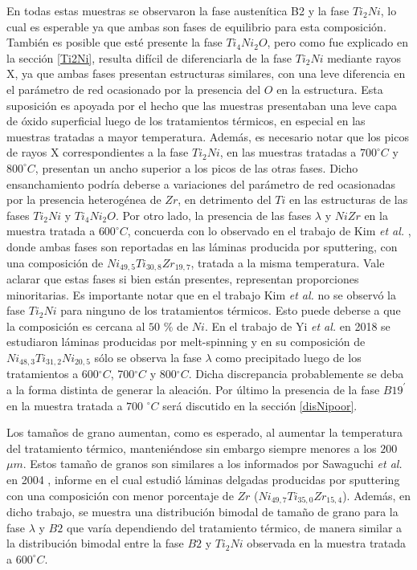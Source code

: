 \documentclass[12pt]{article}
\theoremstyle{definition}
\theoremstyle{remark}
\begin{document}
{En todas estas muestras se observaron la fase austenítica B2 y la fase $Ti_2Ni$, lo cual es esperable ya que ambas son fases de equilibrio para esta composición. También es posible que esté presente la fase $Ti_4Ni_2O$, pero como fue explicado en la sección \ref{Ti2Ni}, resulta difícil de diferenciarla de la fase $Ti_2Ni$ mediante rayos X, ya que ambas fases presentan estructuras similares, con una leve diferencia en el parámetro de red ocasionado por la presencia del $O$ en la estructura. Esta suposición es apoyada por el hecho que las muestras presentaban una leve capa de óxido superficial luego de los tratamientos térmicos, en especial en las muestras tratadas a mayor temperatura. Además, es necesario notar que los picos de rayos X correspondientes a la fase $Ti_2Ni$, en las muestras tratadas a $700 ^\circ C$ y $800 ^\circ C$, presentan un ancho superior a los picos de las otras fases. Dicho ensanchamiento podría deberse a variaciones del parámetro de red ocasionadas por la presencia heterogénea de $Zr$, en detrimento del $Ti$ en las estructuras de las fases $Ti_2Ni$ y $Ti_4Ni_2O$. Por otro lado, la presencia de las fases $\lambda$ y $NiZr$ en la muestra tratada a $600^\circ C$, concuerda con lo observado en el trabajo de Kim {\it et al.} \citep{HeeYoungKim2009}, donde ambas fases son reportadas en las láminas producida por sputtering, con una composición de $Ni_{49,5} Ti_{30,8} Zr_{19,7}$, tratada a la misma temperatura. Vale aclarar que estas fases si bien están presentes, representan proporciones minoritarias. Es importante notar que en el trabajo Kim {\it et al.} no se observó la fase $Ti_2Ni$ para ninguno de los tratamientos térmicos. Esto puede deberse a que la composición es cercana al $50$ $\%$ de $Ni$. En el trabajo de Yi {\it et al.} en 2018 \citep{XiaoyangYi2018} se estudiaron láminas producidas por melt-spinning y en su composición de $Ni_{48,3}Ti_{31,2}Ni_{20,5}$ sólo se observa la fase $\lambda$ como precipitado luego de los tratamientos a 600$^\circ C$, 700$^\circ C$ y 800$^\circ C$. Dicha discrepancia probablemente se deba a la forma distinta de generar la aleación. Por último la presencia de la fase $B19^{\prime}$ en la muestra tratada a $700$ $^\circ C$ será discutido en la sección \ref{disNipoor}.


Los tamaños de grano aumentan, como es esperado, al aumentar la temperatura del tratamiento térmico, manteniéndose sin embargo siempre menores a los $200$ $\mu m$. Estos tamaño de granos son similares a los informados por Sawaguchi {\it et al.} en 2004 \citep{Sawaguchi2004}, informe en el cual estudió láminas delgadas producidas por sputtering con una composición con menor porcentaje de $Zr$ ($Ni_{49,7} Ti_{35,0} Zr_{15,4}$). Además, en dicho trabajo, se muestra una distribución bimodal de tamaño de grano para la fase $\lambda$ y $B2$  que varía dependiendo del tratamiento térmico, de manera similar a la distribución bimodal entre la fase $B2$ y $Ti_2 Ni$ observada en la muestra tratada a $600 ^\circ C$.} 
\end{document}
